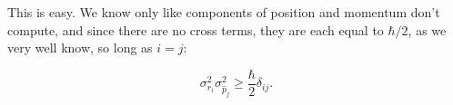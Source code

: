 \begin{parts}
\item This is easy. We know only like components of position and momentum don't compute, and since there are no cross terms, they are each equal to $\hbar/2$, as we very well know, so long as $i=j$:

\begin{equation}
    \boxed{\sigma_{r_i}^2\sigma_{\hat{p}_j}^2 \geq \frac{\hbar}{2}\delta_{ij}.}
\end{equation}




\end{parts}
